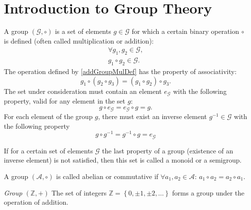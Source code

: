 \section{Introduction to Group Theory}
\label{sec:add:group}
\begin{definition}
\label{def:add:group}
A group $(\mathcal{G}, \circ)$ is a set of elements $g \in \mathcal{G}$ for which a certain binary operation $\circ$ is defined (often called multiplication or addition):
\begin{eqnarray}
\forall g_1,g_2 \in \mathcal{G},
\nonumber \\
g_1 \circ g_2 \in \mathcal{G}.
\label{addGroupMulDef}
\end{eqnarray}
The operation defined by \eqref{addGroupMulDef} has the property of associativity:
\begin{equation}
g_1 \circ \left( g_2 \circ g_3 \right ) = 
\left( g_1 \circ  g_2 \right ) \circ g_3.
\nonumber
\end{equation}
The set under consideration must contain an element $e_{\mathcal{G}}$ with the following property, valid for any element in the set $g$:
\begin{equation}
g \circ e_{\mathcal{G}} = e_{\mathcal{G}} \circ g = g.
\nonumber
\end{equation}
For each element of the group $g$, there must exist an inverse element $g^{-1} \in \mathcal{G}$ with the following property
\begin{equation}
g \circ g^{-1} = g^{-1} \circ g = e_{\mathcal{G}}
\nonumber
\end{equation} 
\end{definition}

\begin{definition}[Monoid]
\label{def:add:monoid}
If for a certain set of elements $\mathcal{G}$ the last property of a group (existence of an inverse element) is not satisfied, then this set is called a monoid or a semigroup.
\end{definition}

\begin{definition}
\label{def:add:abeliangroup}
A group $(\mathcal{A}, \circ)$ is called abelian or commutative if $\forall a_1,a_2 \in \mathcal{A}$: $a_1 \circ a_2 = a_2 \circ a_1$.
\end{definition}

\begin{example}
\emph{Group $\left(\mathbb{Z}, +\right)$}
The set of integers $\mathbb{Z} = \left\{0, \pm1, \pm2, \dots\right\}$ forms a group under the operation of addition.
\nonumber
\end{example}

